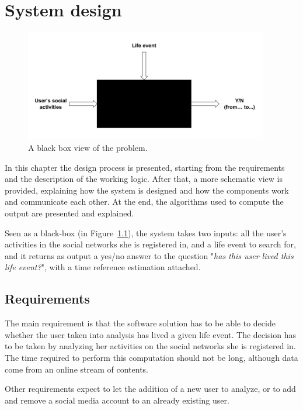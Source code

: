 \chapter{System design}
\label{cha:design}

\begin{figure}
\centering
\includegraphics[width=%
0.95\textwidth]{img/bb}
\caption{A black box view of the problem.}
\label{fig:bb}
\end{figure}

In this chapter the design process is presented, starting from the requirements and the description of the working logic. After that, a more schematic view is provided, explaining how the system is designed and how the components work and communicate each other. At the end, the algorithms used to compute the output are presented and explained.

Seen as a black-box (in Figure~\ref{fig:bb}), the system takes two inputs: all the user's activities in the social networks she is registered in, and a life event to search for, and it returns as output a yes/no answer to the question "\textit{has this user lived this life event?}", with a time reference estimation attached.

\section{Requirements}

The main requirement is that the software solution has to be able to decide whether the user taken into analysis has lived a given life event. The decision has to be taken by analyzing her activities on the social networks she is registered in. The time required to perform this computation should not be long, although data come from an online stream of contents.

Other requirements expect to let the addition of a new user to analyze, or to add and remove a social media account to an already existing user.

